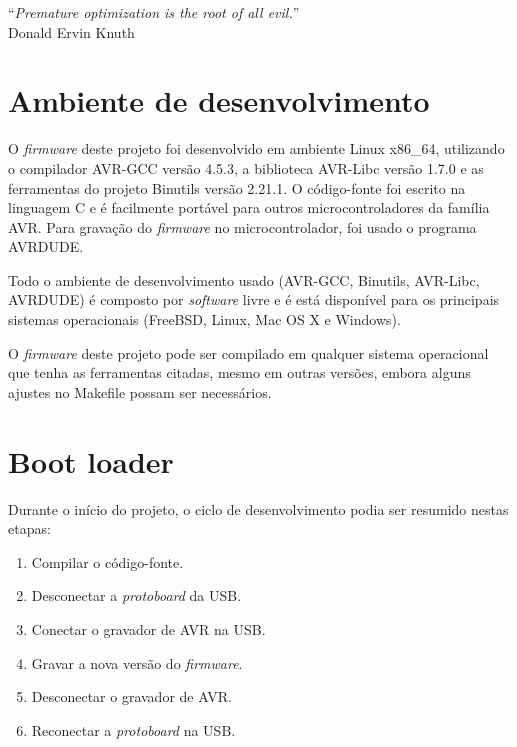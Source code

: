 \documentclass[brazil,pagestart=firstchapter]{abnt}
\begin{document}
\vfill{}
\begin{flushright}{}
``\emph{Premature optimization is the root of all evil.}''\\
{\small Donald Ervin Knuth}
\end{flushright}{\small \par}
\vfill{}

\newpage


\section{Ambiente de desenvolvimento}
\label{sec:software_ambiente}

O \textit{firmware} deste projeto foi desenvolvido em ambiente Linux x86\_64,
utilizando o compilador AVR-GCC versão 4.5.3, a biblioteca AVR-Libc versão
1.7.0 e as ferramentas do projeto Binutils versão 2.21.1. O código-fonte foi
escrito na linguagem C e é facilmente portável para outros
microcontroladores da família AVR. Para gravação do \textit{firmware} no
microcontrolador, foi usado o programa AVRDUDE.

Todo o ambiente de desenvolvimento usado (AVR-GCC, Binutils, AVR-Libc,
AVRDUDE) é composto por \textit{software} livre e é está disponível para os
principais sistemas operacionais (FreeBSD, Linux, Mac OS X e Windows).
\cite{avrlibcoverview}

O \textit{firmware} deste projeto pode ser compilado em qualquer sistema
operacional que tenha as ferramentas citadas, mesmo em outras versões,
embora alguns ajustes no Makefile possam ser necessários.


\section{Boot loader}
\label{sec:bootloader}

Durante o início do projeto, o ciclo de desenvolvimento podia ser resumido
nestas etapas:

\begin{enumerate}
\item Compilar o código-fonte.
\item Desconectar a \textit{protoboard} da \ac{USB}.
\item Conectar o gravador de AVR na \ac{USB}.
\item Gravar a nova versão do \textit{firmware}.
\item Desconectar o gravador de AVR.
\item Reconectar a \textit{protoboard} na \ac{USB}.
\end{enumerate}
\end{document}

